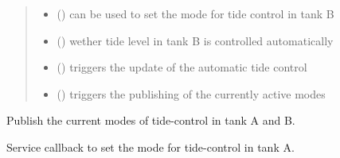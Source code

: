 \documentclass[a4paper,12pt,twoside]{article}
\begin{document}
\begin{fulllineitems}
\begin{quote}
\begin{description}
\begin{itemize}
\item {} 
 () \textendash{} can be used to set the mode for tide control in tank B

\item {} 
 () \textendash{} wether tide level in tank B is controlled automatically

\item {} 
 () \textendash{} triggers the update of the automatic tide control

\item {} 
 () \textendash{} triggers the publishing of the currently active modes

\end{itemize}

\end{description}\end{quote}

\begin{fulllineitems}
\label{\detokenize{meso_control_pkg:meso_control_pkg.tide_sim.TideSim.publish_mode}}
Publish the current modes of tide-control in tank A and B.

\end{fulllineitems}


\begin{fulllineitems}
\label{\detokenize{meso_control_pkg:meso_control_pkg.tide_sim.TideSim.set_auto_tide_a}}
Service callback to set the mode for tide-control in tank A.

\end{fulllineitems}


\end{fulllineitems}
\end{document}
